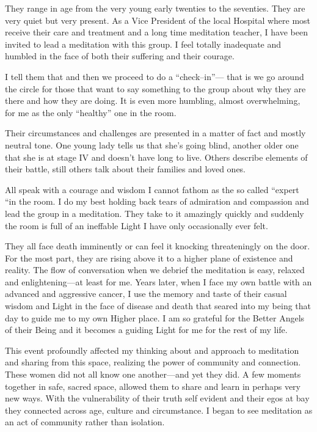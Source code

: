 \documentclass[12pt]{book}
\begin{document}
They range in age from the very young early twenties to the
seventies. They are very quiet but very present. As a Vice President
of the local Hospital where most receive their care and treatment and
a long time meditation teacher, I have been invited to lead a
meditation with this group. I feel totally inadequate and humbled in
the face of both their suffering and their courage.

I tell them that and then we proceed to do a ``check--in''--- that is we
go around the circle for those that want to say something to the
group about why they are there and how they are doing. It is even
more humbling, almost overwhelming, for me as the only ``healthy'' one
in the room.

Their circumstances and challenges are presented in a matter of fact
and mostly neutral tone. One young lady tells us that she's going
blind, another older one that she is at stage IV and doesn't have
long to live. Others describe elements of their battle, still others
talk about their families and loved ones.

All speak with a courage and wisdom I cannot fathom as the so called
“expert “in the room.  I do my best holding back tears of admiration
and compassion and lead the group in a meditation. They take to it
amazingly quickly and suddenly the room is full of an ineffable Light
I have only occasionally ever felt.

They all face death imminently or can feel it knocking threateningly on
the door.
For the most part, they are rising above it to a higher
plane of existence and reality. The flow of conversation when we
debrief the meditation is easy, relaxed and enlightening---at least for
me.
Years later, when I face my own battle with an advanced and
aggressive cancer, I use the memory and taste of their casual wisdom
and Light in the face of disease and death that seared into my being
that day to guide me to my own Higher place. I am so grateful for the
Better Angels of their Being and it becomes a guiding Light for me for
the rest of my life.

This event profoundly affected my thinking about and approach to
meditation and sharing from this space, realizing the power of
community and connection. These women did not all know one another---and
yet they did. A few moments together in safe, sacred space, allowed
them to share and learn in perhaps very new ways.  With the
vulnerability of their truth self evident and their egos at bay they
connected across age, culture and circumstance. I began to see
meditation as an act of community rather than isolation.
\end{document}
